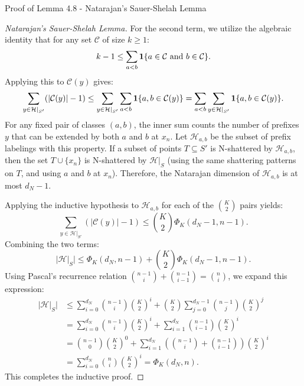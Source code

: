 \begin{sourceblock}{Proof of Lemma 4.8 - Natarajan's Sauer-Shelah Lemma}
\begin{proof}[Natarajan's Sauer-Shelah Lemma]
For the second term, we utilize the algebraic identity that for any set $\mathcal{C}$ of size $k \ge 1$:
\begin{equation}
    k - 1 \le \sum_{a < b} \mathbf{1}\{a \in \mathcal{C} \text{ and } b \in \mathcal{C}\}.
\end{equation}
Applying this to $\mathcal{C}(y)$ gives:
\begin{equation}
    \sum_{y \in \mathcal{H}|_{S'}} (|\mathcal{C}(y)| - 1) \le \sum_{y \in \mathcal{H}|_{S'}} \sum_{a < b} \mathbf{1}\{a, b \in \mathcal{C}(y)\} = \sum_{a < b} \sum_{y \in \mathcal{H}|_{S'}} \mathbf{1}\{a, b \in \mathcal{C}(y)\}.
\end{equation}
For any fixed pair of classes $(a, b)$, the inner sum counts the number of prefixes $y$ that can be extended by both $a$ and $b$ at $x_n$. Let $\mathcal{H}_{a,b}$ be the subset of prefix labelings with this property. If a subset of points $T \subseteq S'$ is N-shattered by $\mathcal{H}_{a,b}$, then the set $T \cup \{x_n\}$ is N-shattered by $\mathcal{H}|_S$ (using the same shattering patterns on $T$, and using $a$ and $b$ at $x_n$). Therefore, the Natarajan dimension of $\mathcal{H}_{a,b}$ is at most $d_N - 1$.

Applying the inductive hypothesis to $\mathcal{H}_{a,b}$ for each of the $\binom{K}{2}$ pairs yields:
\begin{equation}
    \sum_{y \in \mathcal{H}|_{S'}} (|\mathcal{C}(y)| - 1) \le \binom{K}{2} \Phi_K(d_N - 1, n - 1).
\end{equation}
Combining the two terms:
\begin{equation}
    |\mathcal{H}|_S| \le \Phi_K(d_N, n - 1) + \binom{K}{2}\Phi_K(d_N - 1, n - 1).
\end{equation}
Using Pascal's recurrence relation $\binom{n-1}{i} + \binom{n-1}{i-1} = \binom{n}{i}$, we expand this expression:
\begin{align}
    |\mathcal{H}|_S| &\le \sum_{i=0}^{d_N} \binom{n-1}{i} \binom{K}{2}^i + \binom{K}{2}\sum_{j=0}^{d_N-1} \binom{n-1}{j}\binom{K}{2}^j \nonumber \\
    &= \sum_{i=0}^{d_N} \binom{n-1}{i} \binom{K}{2}^i + \sum_{i=1}^{d_N} \binom{n-1}{i-1}\binom{K}{2}^i \nonumber \\
    &= \binom{n-1}{0}\binom{K}{2}^0 + \sum_{i=1}^{d_N} \left( \binom{n-1}{i} + \binom{n-1}{i-1} \right) \binom{K}{2}^i \nonumber \\
    &= \sum_{i=0}^{d_N} \binom{n}{i} \binom{K}{2}^i = \Phi_K(d_N, n).
\end{align}
This completes the inductive proof.
\end{proof}
\end{sourceblock}

